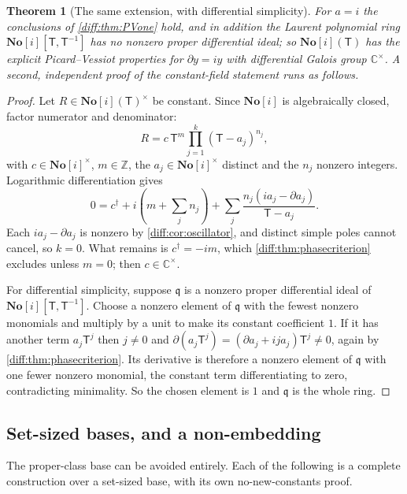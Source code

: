 \documentclass[11pt,letterpaper]{article}
\numberwithin{equation}{section}
\newtheorem{theorem}{Theorem}[section]
\theoremstyle{definition}
\theoremstyle{remark}
\newcommand{\SC}{\mathbf{No}[i]}
\newcommand{\C}{\mathbb C}
\newcommand{\Z}{\mathbb Z}
\newcommand{\der}{\partial}
\begin{document}
\begin{theorem}[The same extension, with differential simplicity]
\label{diff:thm:extension}
For $a=i$ the conclusions of \cref{diff:thm:PVone} hold, and in addition the
Laurent polynomial ring $\SC[\mathsf T,\mathsf T^{-1}]$ has no nonzero proper differential
ideal; so $\SC(\mathsf T)$ has the explicit Picard--Vessiot properties for
$\der y=iy$ with differential Galois group $\C^{\times}$. A second, independent
proof of the constant-field statement runs as follows.
\end{theorem}
\begin{proof}
Let $R\in\SC(\mathsf T)^{\times}$ be constant. Since $\SC$ is algebraically closed,
factor numerator and denominator:
\[
 R=c\,\mathsf T^{m}\prod_{j=1}^{k}(\mathsf T-a_{j})^{n_{j}},
\]
with $c\in\SC^{\times}$, $m\in\Z$, the $a_{j}\in\SC^{\times}$ distinct and the
$n_{j}$ nonzero integers. Logarithmic differentiation gives
\begin{equation}\label{diff:eq:rationalconstant}
 0=c^{\dagger}+i\left(m+\sum_{j}n_{j}\right)
 +\sum_{j}\frac{n_{j}(ia_{j}-\der a_{j})}{\mathsf T-a_{j}} .
\end{equation}
Each $ia_{j}-\der a_{j}$ is nonzero by \cref{diff:cor:oscillator}, and
distinct simple poles cannot cancel, so $k=0$. What remains is
$c^{\dagger}=-im$, which \cref{diff:thm:phasecriterion} excludes unless
$m=0$; then $c\in\C^{\times}$.

For differential simplicity, suppose $\mathfrak{q}$ is a nonzero proper
differential ideal of $\SC[\mathsf T,\mathsf T^{-1}]$. Choose a nonzero element of
$\mathfrak{q}$ with the fewest nonzero monomials and multiply by a unit to make
its constant coefficient $1$.
If it has another term $a_{j}\mathsf T^{j}$ then $j\neq0$ and
$\der(a_{j}\mathsf T^{j})=(\der a_{j}+ija_{j})\mathsf T^{j}\neq0$, again by
\cref{diff:thm:phasecriterion}. Its derivative is therefore a nonzero element
of $\mathfrak{q}$ with one fewer nonzero monomial, the constant term
differentiating to zero, contradicting minimality. So the chosen element is $1$
and $\mathfrak{q}$ is the whole ring.
\end{proof}

\subsection{Set-sized bases, and a non-embedding}
\label{diff:sub:PVsetsized}

The proper-class base can be avoided entirely. Each of the following is a
complete construction over a set-sized base, with its own no-new-constants
proof.
\end{document}
